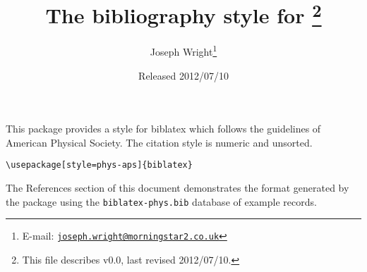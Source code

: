 \documentclass[a4paper]{ltxdoc}
\author{Joseph Wright\thanks{E-mail: 
  \href{mailto:joseph.wright@morningstar2.co.uk}
  {\texttt{joseph.wright@morningstar2.co.uk}}}}
\title{The \pkg{phys-aps} bibliography style for \pkg{biblatex}%
  \footnote{This file describes v0.0, last revised 2012/07/10.}}
\date{Released 2012/07/10}
\providecommand*{\pkg}[1]{\textsf{#1}}
\begin{document}
\maketitle

This package provides a style for \pkg{biblatex} which follows the
guidelines of American Physical Society. The citation style is numeric
and unsorted.
\begin{verbatim}
\usepackage[style=phys-aps]{biblatex}
\end{verbatim}
The References section of this document demonstrates the format 
generated by the package using the \texttt{biblatex-phys.bib} database
of example records.

\nocite{*}

\printbibliography
\end{document}
